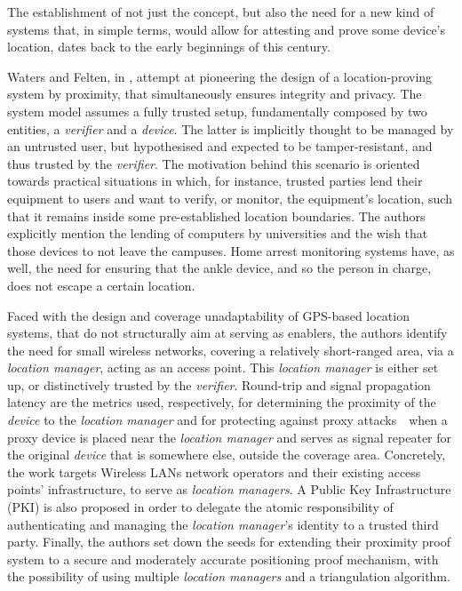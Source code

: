 The establishment of not just the concept, but also the need for a new kind of systems that, in simple terms, would allow for attesting and prove some device's location, dates back to the early beginnings of this century. 

Waters and Felten, in \cite{waters2003secure}, attempt at pioneering the design of a location-proving system by proximity, that simultaneously ensures integrity and privacy. The system model assumes a fully trusted setup, fundamentally composed by two entities, a \emph{verifier} and a \emph{device}. The latter is implicitly thought to be managed by an untrusted user, but hypothesised and expected to be tamper-resistant, and thus trusted by the \emph{verifier}. The motivation behind this scenario is oriented towards practical situations in which, for instance, trusted parties lend their equipment to users and want to verify, or monitor, the equipment's location, such that it remains inside some pre-established location boundaries. The authors explicitly mention the lending of computers by universities and the wish that those devices to not leave the campuses. Home arrest monitoring systems have, as well, the need for ensuring that the ankle device, and so the person in charge, does not escape a certain location. 

Faced with the design and coverage unadaptability of GPS-based location systems, that do not structurally aim at serving as \pol{} enablers, the authors identify the need for small wireless networks, covering a relatively short-ranged area, via a \emph{location manager}, acting as an access point. This \emph{location manager} is either set up, or distinctively trusted by the \emph{verifier}. Round-trip and signal propagation latency are the metrics used, respectively, for determining the proximity of the \emph{device} to the \emph{location manager} and for protecting against proxy attacks~\textemdash~when a proxy device is placed near the \emph{location manager} and serves as signal repeater for the original \emph{device} that is somewhere else, outside the coverage area. Concretely, the work targets Wireless LANs network operators and their existing access points' infrastructure, to serve as \emph{location managers}. A Public Key Infrastructure (PKI) is also proposed in order to delegate the atomic responsibility of authenticating and managing the \emph{location manager}'s identity to a trusted third party. Finally, the authors set down the seeds for extending their proximity proof system to a secure and moderately accurate positioning proof mechanism, with the possibility of using multiple \emph{location managers} and a triangulation algorithm.

